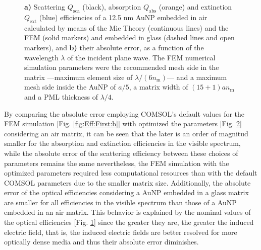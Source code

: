 \begin{figure}[h!]
 \def\svgwidth{.95\textwidth}
 \small
 \centering
    \hspace*{-.78\textwidth}
     \begin{subfigure}{\textwidth}\caption{}\label{fig:Eff:Conv:a}\end{subfigure}\\[10.85em]
    \hspace*{-.78\textwidth}
     \begin{subfigure}{\textwidth}\caption{}\label{fig:Eff:Conv:b}\end{subfigure}\\[-14.3em]
\caption[Scattering, Absorption and Extinction Efficiencies of a 12.5 nm AuNP$@$Air: Analytical and FEM solutions with optimized parameters for a FEM simulation]{\textbf{a)} Scattering $Q_\text{sca}$ (black), absorption $Q_\text{abs}$ (orange) and extinction $Q_\text{ext}$ (blue) efficiencies of a 12.5 nm AuNP embedded in air calculated by means of the Mie Theory (continuous lines) and the FEM (solid markers) and embedded in glass (dashed lines and open markers), and \textbf{b)} their absolute error, as a function of the wavelength $\lambda$ of the incident plane wave. The FEM numerical simulation parameters were the recommended mesh side in the matrix ---maximum element size of $\lambda/(6n_\text{m})$--- and a maximum mesh side inside the AuNP of $a/5$, a matrix width of $(15+1) a n_\text{m}$ and a PML thickness of $\lambda/4$.}
\label{fig:Eff:Conv}
\end{figure}

By comparing the absolute error employing COMSOL's default values for the FEM simulation [Fig. \ref{fig:Eff:First:b}] with optimized the parameters [Fig. \ref{fig:Eff:Conv:b}] considering an air matrix, it can be seen that the later is an order of magnitud smaller for the absorption and extinction efficiencies in the visible spectrum, while the absolute error of the scattering efficiency between these choices of parameters remains the same nevertheless, the FEM simulation with the optimized parameters required less computational resources than with the default COMSOL parameters due to the smaller matrix size. Additionally, the absolute error of the optical efficiencies considering a AuNP embedded in a glass matrix are smaller for all efficiencies in the visible spectrum than those of a AuNP embedded in an air matrix. This behavior is explained by the nominal values of the optical efficiencies [Fig. \ref{fig:Eff:Conv:a}] since the greater they are, the greater the induced electric field, that is, the induced electric fields are better resolved for more optically dense media and thus their absolute error diminishes.
